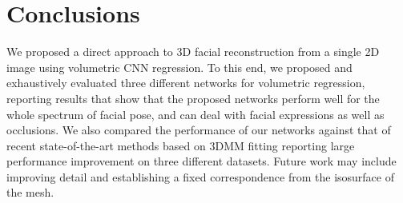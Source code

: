 \section{Conclusions}

We proposed a direct approach to 3D facial reconstruction from a
single 2D image using volumetric CNN regression. To this end, we
proposed and exhaustively evaluated three different networks for
volumetric regression, reporting results that show that the proposed
networks perform well for the whole spectrum of facial pose, and can
deal with facial expressions as well as occlusions. We also compared
the performance of our networks against that of recent
state-of-the-art methods based on 3DMM fitting reporting large
performance improvement on three different datasets.
Future work may include improving detail and establishing a fixed correspondence from the isosurface of the mesh.









% 
% 

